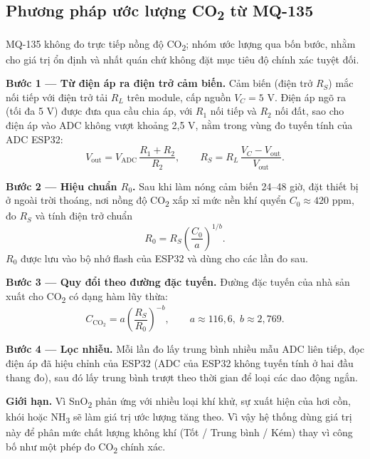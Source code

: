 \documentclass[12pt,a4paper]{article}
\begin{document}
\noindent\begin{minipage}{\linewidth}
\setlength{\parskip}{6pt}
\subsection{Phương pháp ước lượng CO\textsubscript{2} từ MQ-135}\label{sec:mq135}
MQ-135 không đo trực tiếp nồng độ CO\textsubscript{2}; nhóm ước lượng qua bốn bước, nhằm cho giá trị ổn định và nhất quán chứ không đặt mục tiêu độ chính xác tuyệt đối.

\textbf{Bước 1 --- Từ điện áp ra điện trở cảm biến.} Cảm biến (điện trở $R_S$) mắc nối tiếp với điện trở tải $R_L$ trên module, cấp nguồn $V_C = 5$ V. Điện áp ngõ ra (tối đa 5 V) được đưa qua cầu chia áp, với $R_1$ nối tiếp và $R_2$ nối đất, sao cho điện áp vào ADC không vượt khoảng 2,5 V, nằm trong vùng đo tuyến tính của ADC ESP32:
\[
  V_{\text{out}} = V_{\text{ADC}}\,\frac{R_1 + R_2}{R_2},
  \qquad
  R_S = R_L\,\frac{V_C - V_{\text{out}}}{V_{\text{out}}}.
\]

\textbf{Bước 2 --- Hiệu chuẩn $R_0$.} Sau khi làm nóng cảm biến 24--48 giờ, đặt thiết bị ở ngoài trời thoáng, nơi nồng độ CO\textsubscript{2} xấp xỉ mức nền khí quyển $C_0 \approx 420$ ppm, đo $R_S$ và tính điện trở chuẩn
\[
  R_0 = R_S \left(\frac{C_0}{a}\right)^{1/b}.
\]
$R_0$ được lưu vào bộ nhớ flash của ESP32 và dùng cho các lần đo sau.

\textbf{Bước 3 --- Quy đổi theo đường đặc tuyến.} Đường đặc tuyến của nhà sản xuất cho CO\textsubscript{2} có dạng hàm lũy thừa:
\[
  C_{\text{CO}_2} = a\left(\frac{R_S}{R_0}\right)^{-b},
  \qquad a \approx 116{,}6,\; b \approx 2{,}769.
\]

\textbf{Bước 4 --- Lọc nhiễu.} Mỗi lần đo lấy trung bình nhiều mẫu ADC liên tiếp, đọc điện áp đã hiệu chỉnh của ESP32 (ADC của ESP32 không tuyến tính ở hai đầu thang đo), sau đó lấy trung bình trượt theo thời gian để loại các dao động ngắn.

\textbf{Giới hạn.} Vì SnO\textsubscript{2} phản ứng với nhiều loại khí khử, sự xuất hiện của hơi cồn, khói hoặc NH\textsubscript{3} sẽ làm giá trị ước lượng tăng theo. Vì vậy hệ thống dùng giá trị này để phân mức chất lượng không khí (Tốt / Trung bình / Kém) thay vì công bố như một phép đo CO\textsubscript{2} chính xác.
\end{minipage}
\par\bigskip
\end{document}
